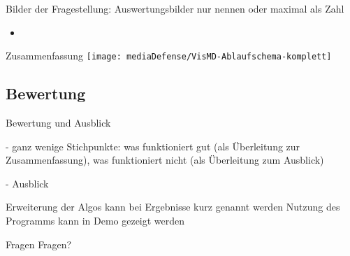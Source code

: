 \documentclass[10pt]{beamer}
\begin{document}
\begin{frame}
	Bilder der Fragestellung: Auswertungsbilder nur nennen
	oder maximal als Zahl

	\begin{itemize}
		\item 
	\end{itemize}
\end{frame}

\begin{wideframe}{Zusammenfassung}
	\texttt{[image: mediaDefense/VisMD-Ablaufschema-komplett]}
\end{wideframe}

\subsection{Bewertung}
\begin{frame}{Bewertung und Ausblick}

- ganz wenige Stichpunkte: was funktioniert gut (als Überleitung zur Zusammenfassung), was funktioniert nicht (als Überleitung zum Ausblick)

- Ausblick
	
	Erweiterung der Algos kann bei Ergebnisse kurz genannt werden
	Nutzung des Programms kann in Demo gezeigt werden
\end{frame}

\begin{frame}{Fragen}
	Fragen?
\end{frame}
\end{document}
